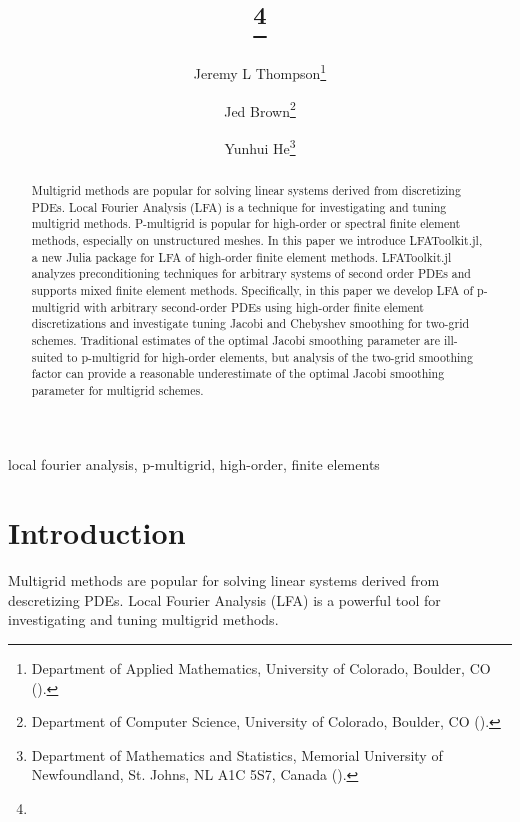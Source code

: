 \documentclass[review]{siamart190516}
\author{
Jeremy L Thompson\thanks{Department of Applied Mathematics, University of Colorado, Boulder, CO
  (\email{jeremy@jeremylt.org}).}
\and Jed Brown\thanks{Department of Computer Science, University of Colorado, Boulder, CO
  (\email{jed@jedbrown.org}).}
\and Yunhui He\thanks{Department of Mathematics and Statistics, Memorial University of Newfoundland, St. Johns, NL A1C 5S7, Canada
  (\email{yunhui.he@mun.ca}).}
}
\title{{\TheTitle}\thanks{\TheFunding}}
\begin{document}
\maketitle

\vspace{1cm}

\begin{abstract}
Multigrid methods are popular for solving linear systems derived from discretizing PDEs.
Local Fourier Analysis (LFA) is a technique for investigating and tuning multigrid methods.
P-multigrid is popular for high-order or spectral finite element methods, especially on unstructured meshes.
In this paper we introduce LFAToolkit.jl, a new Julia package for LFA of high-order finite element methods.
LFAToolkit.jl analyzes preconditioning techniques for arbitrary systems of second order PDEs and supports mixed finite element methods.
Specifically, in this paper we develop LFA of p-multigrid with arbitrary second-order PDEs using high-order finite element discretizations and investigate tuning Jacobi and Chebyshev smoothing for two-grid schemes.
Traditional estimates of the optimal Jacobi smoothing parameter are ill-suited to p-multigrid for high-order elements, but analysis of the two-grid smoothing factor can provide a reasonable underestimate of the optimal Jacobi smoothing parameter for multigrid schemes.
\end{abstract}

\begin{keywords}
  local fourier analysis, p-multigrid, high-order, finite elements
\end{keywords}

\section{Introduction}\label{sec:intro}

Multigrid methods \cite{brandt1982guide, briggs2000multigrid, stuben1982multigrid} are popular for solving linear systems derived from descretizing PDEs.
Local Fourier Analysis (LFA) \cite{brandt1977multi, wienands2004practical} is a powerful tool for investigating and tuning multigrid methods.
\end{document}

